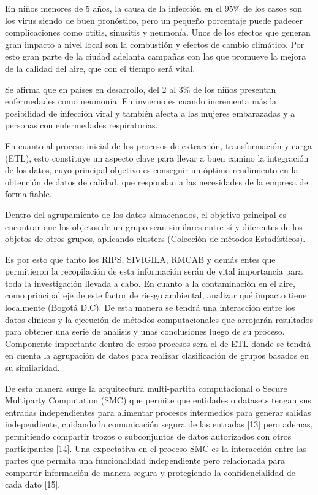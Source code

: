\documentclass[a4paper, 12pt, oneside]{article}
\theoremstyle{definition}
\theoremstyle{remark}
\begin{document}
En niños menores de 5 años, la causa de la infección en el  95\% de los casos son los virus siendo de buen pronóstico, pero un pequeño porcentaje puede padecer complicaciones como  otitis, sinusitis y neumonía. Unos de los efectos que generan gran impacto a nivel local son  la combustión y efectos de cambio climático. Por esto  gran parte de la ciudad adelanta campañas con las que promueve la mejora de la calidad del aire, que con el tiempo será vital.

Se afirma que en países en desarrollo, del 2 al 3\% de los niños presentan enfermedades como neumonía. En invierno es cuando incrementa más la posibilidad de infección viral y también afecta a las mujeres embarazadas y a personas con enfermedades respiratorias.

En cuanto al proceso inicial de los procesos de extracción, transformación y carga (ETL), esto constituye un aspecto clave para llevar a buen camino la integración de los datos, cuyo principal objetivo es conseguir un óptimo rendimiento en la obtención de datos de calidad, que respondan a las necesidades de la empresa de forma fiable.

Dentro del agrupamiento de los datos almacenados, el objetivo principal es encontrar que los objetos de un grupo sean similares entre sí y diferentes de los objetos de otros grupos, aplicando clusters (Colección de métodos Estadísticos).

Es por esto que tanto los  RIPS, SIVIGILA, RMCAB y demás entes que permitieron la recopilación de esta información serán de vital importancia para toda la investigación llevada a cabo. En cuanto a la contaminación en el aire, como principal eje de este factor de riesgo ambiental, analizar qué impacto tiene localmente (Bogotá D.C). De esta manera se tendrá una interacción entre los datos clínicos y la ejecución de métodos computacionales que arrojarán resultados para obtener una serie de análisis y unas conclusiones luego de su proceso. Componente importante dentro de estos procesos sera el de ETL donde se tendrá en cuenta la agrupación de datos para realizar clasificación de grupos basados en su similaridad. 

De esta manera surge la arquitectura multi-partita computacional o  Secure Multiparty Computation (SMC) que permite que entidades o datasets tengan sus entradas independientes para alimentar procesos intermedios para generar salidas independiente, cuidando la comunicación segura de las entradas [13] pero ademas, permitiendo compartir trozos o subconjuntos de datos autorizados con otros participantes  [14]. Una expectativa en el proceso SMC es la interacción entre las partes que permita una funcionalidad independiente pero relacionada para compartir información de manera segura y protegiendo la confidencialidad de cada dato [15].  
\end{document}
